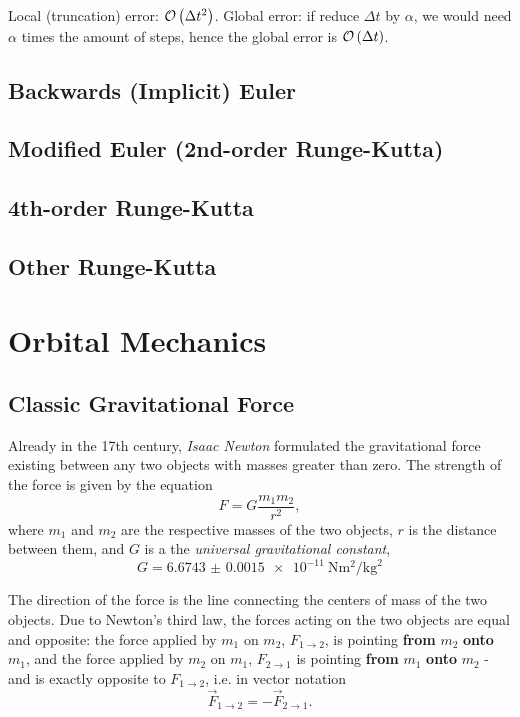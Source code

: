 Local (truncation) error: $\mathcal{O}\left(\Delta t^{2}\right)$. Global error: if reduce $\Delta t$ by $\alpha$, we would need $\alpha$ times the amount of steps, hence the global error is $\mathcal{O}\left(\Delta t\right)$.


\subsection{Backwards (Implicit) Euler}
\subsection{Modified Euler (2nd-order Runge-Kutta)}
\subsection{4th-order Runge-Kutta}
\subsection{Other Runge-Kutta}

\section{Orbital Mechanics}
\subsection{Classic Gravitational Force}
Already in the 17th century, \textit{Isaac Newton} formulated the gravitational force existing between any two objects with masses greater than zero. The strength of the force is given by the equation
\begin{equation}
	F = G\frac{m_{1}m_{2}}{r^{2}},
	\label{eq:force_gravity}
\end{equation}
where $m_{1}$ and $m_{2}$ are the respective masses of the two objects, $r$ is the distance between them, and $G$ is a the \textit{universal gravitational constant},
\begin{equation}
	G = \SI{6.6743(15)e-11}{\newton\metre\squared\per\kg\squared}
	\label{eq:universal_gravity_constant}
\end{equation}

The direction of the force is the line connecting the centers of mass of the two objects. Due to Newton's third law, the forces acting on the two objects are equal and opposite: the force applied by $m_{1}$ on $m_{2}$, $F_{1\to2}$, is pointing \textbf{from} $m_{2}$ \textbf{onto} $m_{1}$, and the force applied by $m_{2}$ on $m_{1}$, $F_{2\to1}$ is pointing \textbf{from} $m_{1}$ \textbf{onto} $m_{2}$ - and is exactly opposite to $F_{1\to2}$, i.e. in vector notation
\begin{equation}
	\vec{F}_{1\to2} = -\vec{F}_{2\to1}.
	\label{eq:gravity_force_vector_directions}
\end{equation}

